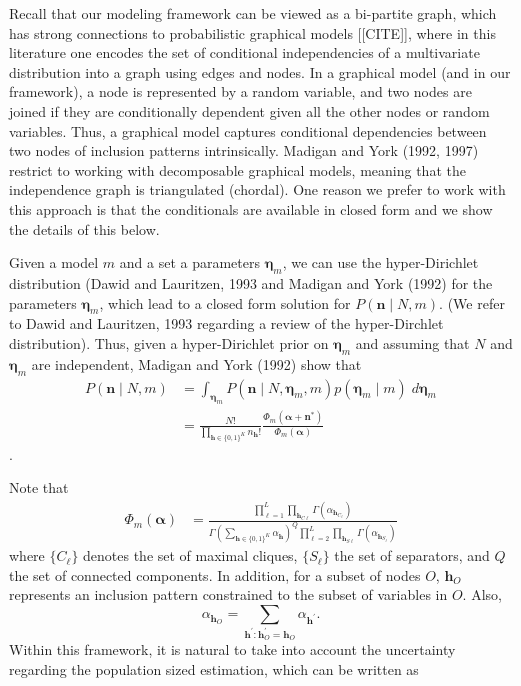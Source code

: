 \documentclass[twoside]{article}
\newcommand{\n}{\boldsymbol{n}}
\newcommand{\h}{\boldsymbol{h}}
\newcommand{\boeta}{\boldsymbol{\eta}}
\newcommand{\balpha}{\boldsymbol{\alpha}}
\begin{document}
Recall that our modeling framework can be viewed as a bi-partite graph, which has strong connections to probabilistic graphical models [[CITE]], where in this literature one encodes the set of conditional independencies of a multivariate distribution into a graph using edges and nodes. In a graphical model (and in our framework), a node is represented by a random variable, and two nodes are joined if they are conditionally dependent given all the other nodes or random variables. Thus, a graphical model captures conditional dependencies between two nodes of inclusion patterns intrinsically. Madigan and York (1992, 1997) restrict to working with decomposable graphical models, meaning that the independence graph is triangulated (chordal). One reason we prefer to work with this approach is that the conditionals are available in closed form and we show the details of this below.

Given a model $m$ and a set a parameters $\boeta_m$, we can use the hyper-Dirichlet distribution (Dawid and Lauritzen, 1993 and Madigan and York (1992) for the parameters $\boeta_m$, which lead to a closed form solution for $P(\n \mid N,m).$ (We refer to Dawid and Lauritzen, 1993 regarding a review of the hyper-Dirchlet distribution). Thus, given a hyper-Dirichlet prior on $\boeta_m$ and assuming that $N$ and $\boeta_m$ are independent, Madigan and York (1992) show that 
\begin{align}
P(\n \mid N, m) &= \int_{\boeta_m} 
P(\n \mid N, \boeta_m, m) p(\boeta_m \mid m) \; d \boeta_m \\
&= 
\frac{N!}
{\prod_{\h \in  \{0,1\}^K} n_{\h}! }
\frac{\Phi_m(\balpha + \n^{*})}
{\Phi_m(\balpha)}
\end{align}.

Note that
\begin{align}
\Phi_m(\balpha)
&=
\frac{
\prod_{\ell=1}^L 
\prod_{\h_{ C{\ell} }}
\Gamma(\alpha_{\h_{C_{\ell}}})
}
{
\Gamma(\sum_{\h \in \{0,1\}^K} \alpha_{\h})^Q
\prod_{\ell=2}^L 
\prod_{\h_{ S{\ell} }}
\Gamma(\alpha_{\h_{S_{\ell}}})
}
\end{align}
where
$\{C_\ell\}$ denotes the set of maximal cliques, $\{S_\ell\}$ the set of separators, and $Q$ the set of connected components. In addition, for a subset of nodes $O$, $\h_O$ represents an inclusion pattern constrained to the subset of variables in $O.$ Also, 
$$\alpha_{\h_O} = \sum_{\h^{\prime}: \h_{O}^{\prime} = \h_O} \alpha_{\h^{\prime}}.$$
Within this framework, it is natural to take into account the uncertainty regarding the population sized estimation, which can be written as 
\end{document}
